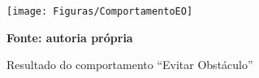 \begin{figure}[!ht]
\centering
\caption{Resultado do comportamento ``Evitar Obstáculo''}
\label{fig:resultadoImplementadoEO}
		\centering
		\texttt{[image: Figuras/ComportamentoEO]}%

	\textbf{Fonte: autoria própria}
\end{figure}